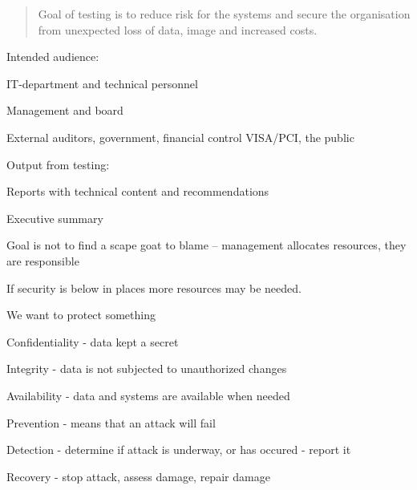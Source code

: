 \documentclass[Screen16to9,17pt]{foils}
\begin{document}

\begin{quote}
Goal of testing is to reduce risk for the systems and secure the organisation\\ from unexpected loss of data, image and increased costs.
\end{quote}

\begin{list1}
\item Intended audience:
\begin{list2}
\item IT-department and technical personnel
\item Management and board
\item External auditors, government, financial control VISA/PCI, the public
\end{list2}
\item Output from testing:
\begin{list2}
\item Reports with technical content and recommendations
\item Executive summary
\end{list2}
\end{list1}

Goal is not to find a scape goat to blame -- management allocates resources, they are responsible

If security is below in places more resources may be needed.




\begin{list1}
\item We want to protect something
\item Confidentiality - data kept a secret
\item Integrity - data is not subjected to unauthorized changes
\item Availability - data and systems are available when needed
\end{list1}




\begin{list1}
\item Prevention - means that an attack will fail
\item Detection - determine if attack is underway, or has occured - report it
\item Recovery - stop attack, assess damage, repair damage
\end{list1}
\end{document}
